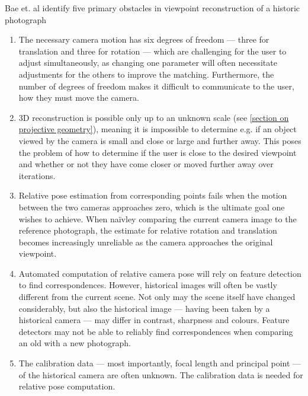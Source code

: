 Bae et. al identify five primary obstacles in viewpoint reconstruction of a
historic photograph
\begin{enumerate}
   \item The necessary camera motion has six degrees of freedom --- three for
      translation and three for rotation --- which are challenging for the user
      to adjust simultaneously, as changing one parameter will often necessitate
      adjustments for the others to improve the matching. Furthermore, the
      number of degrees of freedom makes it difficult to communicate to the
      user, how they must move the camera.
   \item 3D reconstruction is possible only up to an unknown scale (see
      \autoref{section on projective geometry}), meaning it is impossible to
      determine e.g. if an object viewed by the camera is small and close or
      large and further away. This poses the problem of how to determine if the
      user is close to the desired viewpoint and whether or not they have come
      closer or moved further away over iterations. 
   \item Relative pose estimation from corresponding points fails when the
      motion between the two cameras approaches zero, which is the ultimate goal
      one wishes to achieve. When na\"ivley comparing the current camera image
      to the reference photograph, the estimate for relative rotation and
      translation becomes increasingly unreliable as the camera approaches the
      original viewpoint.
   \item Automated computation of relative camera pose will rely on feature
      detection to find correspondences. However, historical images will often
      be vastly different from the current scene. Not only may the scene itself
      have changed considerably, but also the historical image --- having been
      taken by a historical camera --- may differ in contrast, sharpness and
      colours. Feature detectors may not be able to reliably find
      correspondences when comparing an old with a new photograph.
   \item The calibration data --- most importantly, focal length and principal
      point --- of the historical camera are often unknown. The calibration data
      is needed for relative pose computation.
\end{enumerate}



